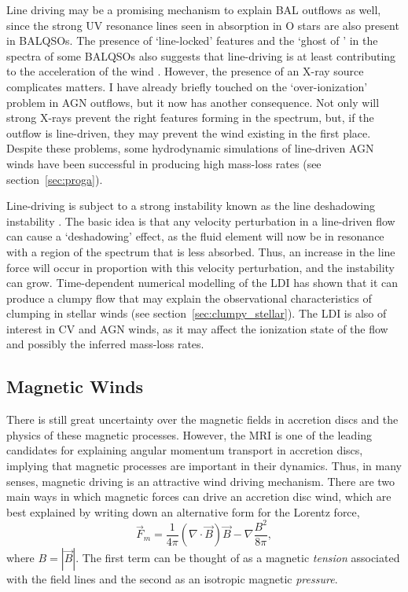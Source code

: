 Line driving may be a promising mechanism to explain BAL outflows as well, since
the strong UV resonance lines seen in absorption in O stars are also 
present in BALQSOs. The presence of `line-locked' features \citep{bowler2014} 
and the `ghost of \la' \citep{arav1995, arav1996, north2006}
in the spectra of some BALQSOs also suggests that line-driving is
at least contributing to the acceleration of the wind 
\citep[but see also][]{cottis2010}.
However, the presence of an X-ray source complicates matters.
I have already briefly touched on the `over-ionization' problem
in AGN outflows, but it now has another consequence. Not only will 
strong X-rays prevent the right features forming in the spectrum, but, if
the outflow is line-driven, they may prevent the wind existing in the first 
place. Despite these problems, some hydrodynamic simulations of line-driven AGN winds
have been successful in producing high mass-loss rates (see section~\ref{sec:proga}).

Line-driving is subject to a strong instability known
as the line deshadowing instability 
\citep[LDI;][]{lucysolomon1970,macgregor1979,owockirybicki1984,owockirybicki1985}.
The basic idea is that any velocity perturbation in a line-driven flow can cause a 
`deshadowing' effect, as the fluid element will now
be in resonance with a region of the spectrum that is less absorbed.
Thus, an increase in the line force will occur in proportion
with this velocity perturbation, and the instability can grow. 
Time-dependent numerical modelling of the LDI has shown that it can
produce a clumpy flow \citep{owocki1988,feldmeier1995,surlan2012,owocki2014}
that may explain the observational characteristics of clumping in 
stellar winds (see section~\ref{sec:clumpy_stellar}). 
The LDI is also of interest in CV and AGN winds, as it
may affect the ionization state of the flow and possibly the inferred
mass-loss rates.


\subsection{Magnetic Winds}
\label{sec:mag_winds}

There is still great uncertainty over the magnetic fields in accretion discs
and the physics of these magnetic processes. However, the MRI is one of the 
leading candidates for explaining angular momentum transport in accretion discs,
implying that magnetic processes are important in their dynamics. 
Thus, in many senses, magnetic driving is an attractive wind driving mechanism.
There are two main ways in which magnetic forces can drive an 
accretion disc wind, which are best explained by writing down an 
alternative form for the Lorentz force,
\begin{equation}
\vec{F}_m = \frac{1}{4\pi} (\nabla \cdot \vec{B}) \vec{B}  - \nabla \frac{B^2}{8\pi},
\end{equation}
where $B = |\vec{B}|$.
The first term can be thought of as a magnetic {\em tension}
associated with the field lines and the second as an isotropic magnetic
{\em pressure}.

